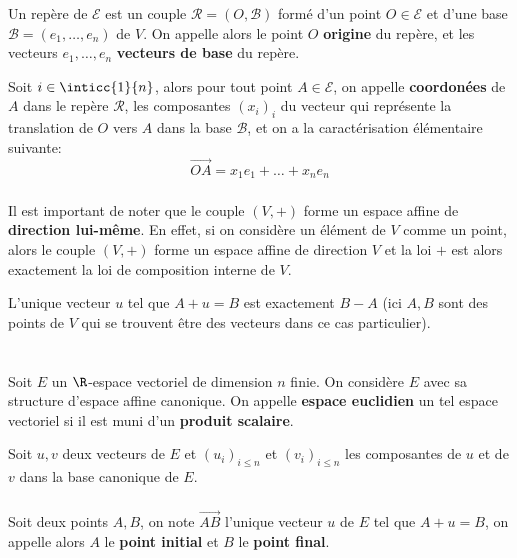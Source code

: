 \subsection*{}
Un repère de \(\mathscr{E}\) est un couple \(\mathscr{R} = (O, \mathscr{B})\) formé d'un point \(O \in \mathscr{E}\) et d'une base \(\mathscr{B} = (e_1, \ldots, e_n)\) de \(V\). On appelle alors le point \(O\) \textbf{origine} du repère, et les vecteurs \(e_1, \ldots, e_n\) \textbf{vecteurs de base} du repère.\<

Soit \(i\in\inticc{1}{n}\), alors pour tout point \(A \in \mathscr{E}\), on appelle \textbf{coordonées} de \(A\) dans le repère \(\mathscr{R}\), les composantes \((x_i)_i\) du vecteur qui représente la translation de \(O\) vers \(A\) dans la base \(\mathscr{B}\), et on a la caractérisation élémentaire suivante:
\[
   \overrightarrow{OA} = x_1e_1 + \ldots + x_ne_n 
\]

\subsection*{}
Il est important de noter que le couple \((V, +)\) forme un espace affine de \textbf{direction lui-même}. En effet, si on considère un élément de \(V\) comme un point, alors le couple  \((V, +)\) forme un espace affine de direction \(V\) et la loi \(+\) est alors exactement la loi de composition interne de \(V\).\<

L'unique vecteur \(u\) tel que \(A + u = B\) est exactement \(B - A\) (ici \(A, B\) sont des points de \(V\) qui se trouvent être des vecteurs dans ce cas particulier). \<\<

\chapter*{} %

Soit \(E\) un \(\R\)-espace vectoriel de dimension \(n\) finie. On considère \(E\) avec sa structure d'espace affine canonique.
On appelle \textbf{espace euclidien} un tel espace vectoriel si il est muni d'un \textbf{produit scalaire}.\<

Soit \(u, v\) deux vecteurs de \(E\) et \((u_i)_{i \leq n}\) et \((v_i)_{i \leq n}\) les composantes de \(u\) et de \(v\) dans la base canonique de \(E\).

\subsection*{}
Soit deux points \(A, B\), on note \(\overrightarrow{AB}\) l'unique vecteur \(u\) de \(E\) tel que \(A + u = B\), on appelle alors \(A\) le \textbf{point initial} et \(B\) le \textbf{point final}. \<

